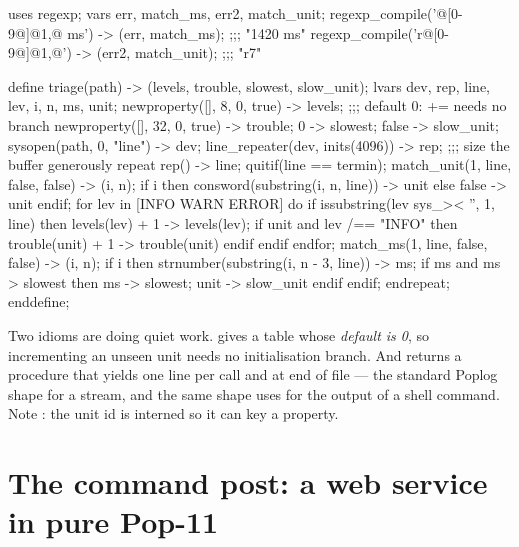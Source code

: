 \begin{pop}
uses regexp;
vars err, match_ms, err2, match_unit;
regexp_compile('@[0-9@]@{1,@} ms') -> (err, match_ms);     ;;; "1420 ms"
regexp_compile('r@[0-9@]@{1,@}')   -> (err2, match_unit);  ;;; "r7"

define triage(path) -> (levels, trouble, slowest, slow_unit);
    lvars dev, rep, line, lev, i, n, ms, unit;
    newproperty([], 8,  0, true) -> levels;    ;;; default 0: += needs no branch
    newproperty([], 32, 0, true) -> trouble;
    0 -> slowest;  false -> slow_unit;
    sysopen(path, 0, "line") -> dev;
    line_repeater(dev, inits(4096)) -> rep;    ;;; size the buffer generously
    repeat
        rep() -> line;
        quitif(line == termin);
        match_unit(1, line, false, false) -> (i, n);
        if i then consword(substring(i, n, line)) -> unit else false -> unit endif;
        for lev in [INFO WARN ERROR] do
            if issubstring(lev sys_>< '', 1, line) then
                levels(lev) + 1 -> levels(lev);
                if unit and lev /== "INFO" then trouble(unit) + 1 -> trouble(unit) endif
            endif
        endfor;
        match_ms(1, line, false, false) -> (i, n);
        if i then
            strnumber(substring(i, n - 3, line)) -> ms;
            if ms and ms > slowest then ms -> slowest; unit -> slow_unit endif
        endif;
    endrepeat;
enddefine;
\end{pop}


Two idioms are doing quiet work.  gives a
table whose \emph{default is 0}, so incrementing an unseen unit needs no
initialisation branch. And  returns a procedure that
yields one line per call and  at end of file --- the standard
Poplog shape for a stream, and the same shape  uses
for the output of a shell command. Note : the unit id is
interned so it can key a property.

\section{The command post: a web service in pure Pop-11}

